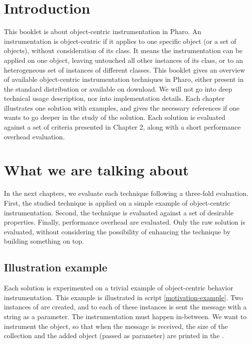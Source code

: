 \documentclass[10pt,twoside,english]{_support/latex/sbabook/sbabook}
\begin{document}
\frontmatter
\pagestyle{plain}

\tableofcontents*
\clearpage\listoffigures

\mainmatter

\chapter{Introduction}
This booklet is about object-centric instrumentation in Pharo. An instrumentation is object-centric if it applies to one specific object (or a set of objects), without consideration of its class. It means the instrumentation can be applied on one object, leaving untouched all other instances of its class, or to an heterogeneous set of instances of different classes. This booklet gives an overview of available object-centric instrumentation techniques in Pharo, either present in the standard distribution or available on download. We will not go into deep technical usage description, nor into implementation details. Each chapter illustrates one solution with examples, and gives the necessary references if one wants to go deeper in the study of the solution. Each solution is evaluated against a set of criteria presented in Chapter 2, along with a short performance overhead evaluation.

\chapter{What we are talking about}
In the next chapters, we evaluate each technique following a three-fold evaluation. First, the studied technique is applied on a simple example of object-centric instrumentation. Second, the technique is evaluated against a set of desirable properties. Finally, performance overhead are evaluated. Only the raw solution is evaluated, without considering the possibility of enhancing the technique by building something on top.
\section{Illustration example}
Each solution is experimented on a trivial example of object-centric behavior instrumentation. This example is illustrated in script \ref{motivation-example}. Two instances of  are created, and to each of these instances is sent the  message with a string as a parameter. The instrumentation must happen in-between. We want to instrument the  object, so that when the  message is received, the size of the collection and the added object (passed as parameter) are printed in the .
\end{document}

